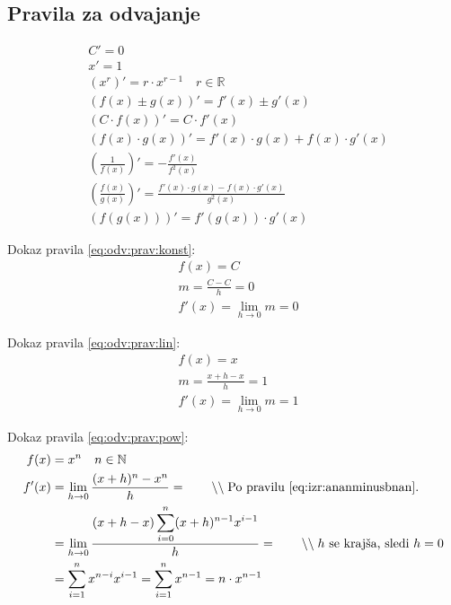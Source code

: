 \documentclass[a4paper,oneside,12pt,fleqn]{article}
\def\R{\ensuremath{\mathbb R}}
\def\N{\ensuremath{\mathbb N}}
\newcommand\krat\cdot
\newcommand{\comment}[1]{\ensuremath{\qquad\backslash\backslash\;}\textnormal{#1}}
\def\limh{\lim_{h\rightarrow0}} %
\numberwithin{equation}{section}
\begin{document}
\subsection{Pravila za odvajanje}
\label{sec:odvod:prav}

\begin{align}
  & C' = 0 \label{eq:odv:prav:konst} \\
  & x' = 1 \label{eq:odv:prav:lin} \\
  & \left( x^r \right)' = r\krat x^{r-1} \quad r \in \R \label{eq:odv:prav:pow} \\
  & (f(x) \pm g(x))' = f'(x) \pm g'(x) \label{eq:odv:prav:sum} \\
  & (C\krat f(x))' = C\krat f'(x) \label{eq:odv:prav:konstkrat} \\
  & (f(x)\krat g(x))' = f'(x)\krat g(x) + f(x)\krat g'(x) \label{eq:odv:prav:krat} \\
  & \left(\frac{1}{f(x)}\right)' = - \frac{f'(x)}{f^2(x)} \label{eq:odv:prav:enaz} \\
  & \left( \frac{f(x)}{g(x)} \right)' = \frac{f'(x)\krat g(x) - f(x)\krat g'(x)}{g^2(x)} \label{eq:odv:prav:del} \\
  & \left( f(g(x)) \right)' = f'(g(x))\krat g'(x) \label{eq:odv:prav:komp}
\end{align}

Dokaz pravila \eqref{eq:odv:prav:konst}:
\begin{align*}
  & f(x) = C \\
  & m = \frac{C - C}{h} = 0 \\
  & f'(x) = \limh  m = 0
\end{align*}

Dokaz pravila \eqref{eq:odv:prav:lin}:
\begin{align*}
  & f(x) = x \\
  & m = \frac{x+h-x}{h} = 1 \\
  & f'(x) = \limh  m = 1
\end{align*}

Dokaz pravila \eqref{eq:odv:prav:pow}:
\begin{align*}
  f(x) &= x^n  \quad n \in \N \\
  f'(x) &= \limh  \frac{(x+h)^n - x^n}{h} = \comment{Po pravilu \eqref{eq:izr:ananminusbnan}.} \\
  &= \limh  \frac{(x+h-x)\displaystyle\sum_{i=0}^n (x+h)^{n-1}x^{i-1}}{h} = \comment{$h$ se krajša, sledi $h = 0$} \\
  &= \sum_{i=1}^nx^{n-i}x^{i-1} = \sum_{i=1}^nx^{n-1} = n\krat x^{n-1}
\end{align*}
\end{document}
